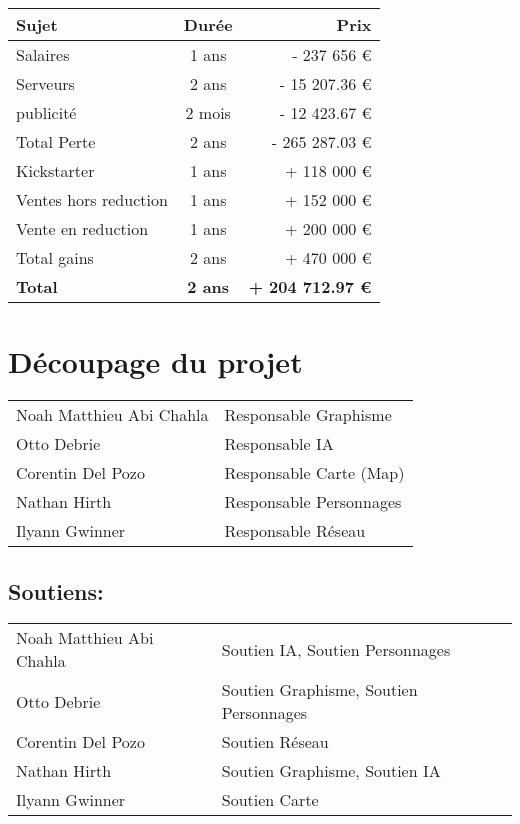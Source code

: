 \documentclass{article}
\begin{document}
\begin{tabular}{| l | c | r |} \hline
   \textbf{Sujet} & \textbf{Durée} & \textbf{Prix} \\ \hline
   Salaires & 1 ans & - 237 656 € \\ \hline
   Serveurs & 2 ans & - 15 207.36 € \\ \hline
   publicité & 2 mois & - 12 423.67 € \\ \hline
   Total Perte & 2 ans & - 265 287.03 € \\ \hline
   Kickstarter & 1 ans & + 118 000 € \\ \hline
   Ventes hors reduction & 1 ans & + 152 000 € \\ \hline
   Vente en reduction & 1 ans & + 200 000 € \\ \hline
   Total gains & 2 ans & + 470 000 € \\ \hline \hline
   \textbf{Total} & \textbf{2 ans} & \textbf{+ 204 712.97 €} \\ \hline
\end{tabular}
\section{Découpage du projet}
\begin{tabular}{l l}
Noah Matthieu Abi Chahla & Responsable Graphisme \\
Otto Debrie & Responsable IA \\
Corentin Del Pozo & Responsable Carte (Map) \\
Nathan Hirth & Responsable Personnages \\
Ilyann Gwinner & Responsable Réseau \\
\end{tabular}

\subsection*{Soutiens:}
\begin{tabular}{l l}
Noah Matthieu Abi Chahla & Soutien IA, Soutien Personnages \\
Otto Debrie & Soutien Graphisme, Soutien Personnages \\
Corentin Del Pozo & Soutien Réseau \\
Nathan Hirth & Soutien Graphisme, Soutien IA \\
Ilyann Gwinner & Soutien Carte \\
\end{tabular}
\end{document}
